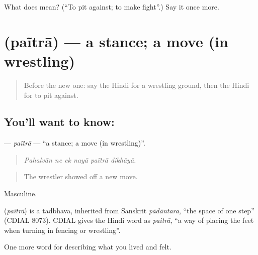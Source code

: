 \begin{tcolorbox}[breakable,colback=teal!4,colframe=teal!35!black,title={Before you move on}]
What does  mean? (\textquotedblleft{}To pit against; to make fight\textquotedblright{}.) Say it once more.
\end{tcolorbox}
\section[\texorpdfstring{\hi{पैंतरा} (paĩtrā)}{पैंतरा (paĩtrā)}]{ (paĩtrā) — a stance; a move (in wrestling)}

\label{lesson:HI-C533-paitra}



\begin{quote}
Before the new one: say the Hindi for a wrestling ground, then the Hindi for to pit against.
\end{quote}

\subsection*{You'll want to know: }
\textbf{} — \emph{paĩtrā} — \textquotedblleft{}a stance; a move (in wrestling)\textquotedblright{}.

\begin{quote}
     
\end{quote}

\begin{quote}
\emph{Pahalvān ne ek nayā paĩtrā dikhāyā.}
\end{quote}

\begin{quote}
The wrestler showed off a new move.
\end{quote}

Masculine.

\begin{cousinweb}
\textbf{} (\emph{paĩtrā}) is a tadbhava, inherited from Sanskrit \emph{pādāntara}, \textquotedblleft{}the space of one step\textquotedblright{} (CDIAL 8073). CDIAL gives the Hindi word as \emph{paitrā}, \textquotedblleft{}a way of placing the feet when turning in fencing or wrestling\textquotedblright{}.
\end{cousinweb}

\begin{grammarlens}[title={What you've built}]
One more word for describing what you lived and felt.
\end{grammarlens}

